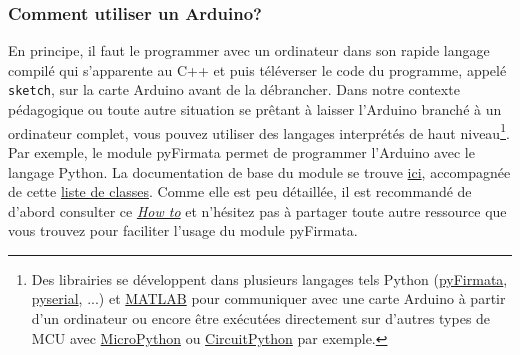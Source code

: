 \documentclass[english,french,12pt]{article}
\begin{document}
\subsubsection*{Comment utiliser un Arduino?}
 En principe, il faut le programmer avec un ordinateur dans son rapide langage compilé qui s'apparente au C++ et puis téléverser le code du programme, appelé \texttt{sketch}, sur la carte Arduino avant de la débrancher. Dans notre contexte pédagogique ou toute autre situation se prêtant à laisser l'Arduino branché à un ordinateur complet, vous pouvez utiliser des langages interprétés de haut niveau\footnote{Des librairies se développent dans plusieurs langages tels Python (\href{https://github.com/tino/pyFirmata}{pyFirmata}, \href{https://pypi.org/project/pyserial/}{pyserial}, ...) et \href{https://www.mathworks.com/help/supportpkg/arduinoio/examples/getting-started-with-matlab-support-package-for-arduino-hardware.html}{MATLAB} pour communiquer avec une carte Arduino à partir d'un ordinateur ou encore être exécutées directement sur d'autres types de MCU avec \href{https://micropython.org/}{MicroPython} ou \href{https://www.digikey.ca/en/maker/blogs/2018/python-on-hardware}{CircuitPython} par exemple.}. Par exemple, le module pyFirmata permet de programmer l'Arduino avec le langage Python. La documentation de base du module se trouve \href{https://pyfirmata.readthedocs.io/en/latest/index.html}{ici}, accompagnée de cette \href{https://pyfirmata.readthedocs.io/en/latest/pyfirmata.html}{liste de classes}. Comme elle est peu détaillée, il est recommandé de d'abord consulter ce \textit{\href{https://realpython.com/arduino-python/}{How to}} et n'hésitez pas à partager toute autre ressource que vous trouvez pour faciliter l'usage du module pyFirmata.
\end{document}
